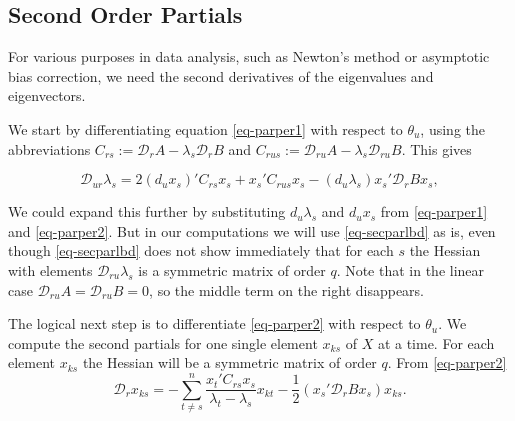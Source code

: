 \documentclass[
  12pt,
  letterpaper,
  DIV=11,
  numbers=noendperiod]{scrartcl}
\begin{document}
\subsection{Second Order Partials}\label{sec-second}

For various purposes in data analysis, such as Newton's method or
asymptotic bias correction, we need the second derivatives of the
eigenvalues and eigenvectors.

We start by differentiating equation \eqref{eq-parper1} with respect to
\(\theta_u\), using the abbreviations
\(C_{rs}:=\mathcal{D}_rA-\lambda_s\mathcal{D}_rB\) and
\(C_{rus}:=\mathcal{D}_{ru}A-\lambda_s\mathcal{D}_{ru}B\). This gives

\begin{equation}
\mathcal{D}_{ur}\lambda_s=2(d_ux_s)'C_{rs}x_s+
x_s'C_{rus}x_s-(d_u\lambda_s)x_s'\mathcal{D}_rBx_s,
\label{eq-secparlbd}
\end{equation}

We could expand this further by substituting \(d_u\lambda_s\) and
\(d_ux_s\) from \eqref{eq-parper1} and \eqref{eq-parper2}. But in our
computations we will use \eqref{eq-secparlbd} as is, even though
\eqref{eq-secparlbd} does not show immediately that for each \(s\) the
Hessian with elements \(\mathcal{D}_{ru}\lambda_s\) is a symmetric
matrix of order \(q\). Note that in the linear case
\(\mathcal{D}_{ru}A=\mathcal{D}_{ru}B=0\), so the middle term on the
right disappears.

The logical next step is to differentiate \eqref{eq-parper2} with
respect to \(\theta_u\). We compute the second partials for one single
element \(x_{ks}\) of \(X\) at a time. For each element \(x_{ks}\) the
Hessian will be a symmetric matrix of order \(q\). From
\eqref{eq-parper2} \begin{equation}
\mathcal{D}_rx_{ks}=-\sum_{t\not= s}^n\frac{x_t'C_{rs}x_s}{\lambda_t-\lambda_s}x_{kt}-\frac12(x_s'\mathcal{D}_rBx_s)x_{ks}.\label{eq-parper3}
\end{equation}
\end{document}
